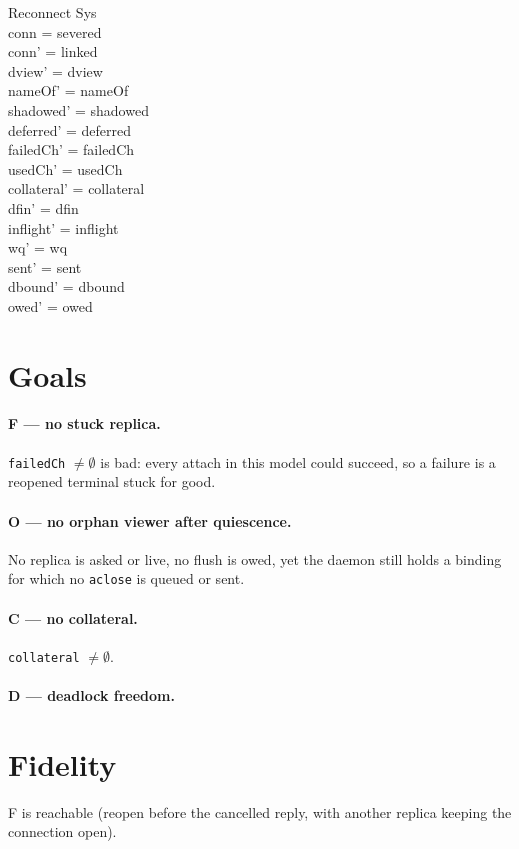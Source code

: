 \documentclass[a4paper,10pt,fleqn]{article}
\begin{document}
\begin{schema}{Reconnect}
  \Delta Sys \\
\where
  conn = severed \\
  conn' = linked \\
  dview' = dview \\
  nameOf' = nameOf \\
  shadowed' = shadowed \\
  deferred' = deferred \\
  failedCh' = failedCh \\
  usedCh' = usedCh \\
  collateral' = collateral \\
  dfin' = dfin \\
  inflight' = inflight \\
  wq' = wq \\
  sent' = sent \\
  dbound' = dbound \\
  owed' = owed
\end{schema}


\section{Goals}

\paragraph{F --- no stuck replica.}  \texttt{failedCh} $\neq \emptyset$ is bad:
every attach in this model could succeed, so a failure is a reopened
terminal stuck for good.

\paragraph{O --- no orphan viewer after quiescence.}  No replica is asked or
live, no flush is owed, yet the daemon still holds a binding for which no
\texttt{aclose} is queued or sent.

\paragraph{C --- no collateral.}  \texttt{collateral} $\neq \emptyset$.

\paragraph{D --- deadlock freedom.}

\section{Fidelity}

F is reachable (reopen before the cancelled reply, with another replica keeping the connection open).
\end{document}
